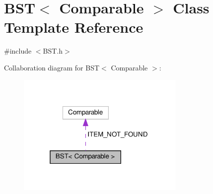 \hypertarget{classBST}{}\section{B\+ST$<$ Comparable $>$ Class Template Reference}
\label{classBST}


{\ttfamily \#include $<$B\+S\+T.\+h$>$}



Collaboration diagram for B\+ST$<$ Comparable $>$\+:\nopagebreak
\begin{figure}[H]
\begin{center}
\leavevmode
\includegraphics[width=229pt]{classBST__coll__graph}
\end{center}
\end{figure}
